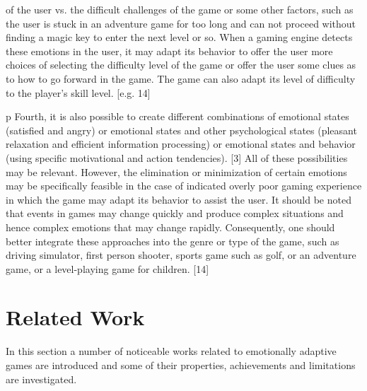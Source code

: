 of the user vs. the difficult challenges of the game or some other factors, such as the user is stuck in an adventure game for too long and can not proceed without finding a magic key to enter the next level or so. When a gaming engine detects these emotions in the user, it may adapt its behavior to offer the user more choices of selecting the difficulty level of the game or offer the user some clues as to how to go forward in the game. The game can also adapt its level of difficulty to the player’s skill level. [e.g. 14]

p Fourth, it is also possible to create different combinations of emotional states (satisfied and angry) or emotional states and other psychological states (pleasant relaxation and efficient information processing) or emotional states and behavior (using specific motivational and action tendencies). [3]  All of these possibilities may be relevant. However, the elimination or minimization of certain emotions may be specifically feasible in the case of indicated overly poor gaming experience in which the game may adapt its behavior to assist the user. It should be noted that events in games may change quickly and produce complex situations and hence complex emotions that may change rapidly. Consequently, one should better integrate these approaches into the genre or type of the game, such as driving simulator, first person shooter, sports game such as golf, or an adventure game, or a level-playing game for children. [14]

\section{Related Work}

In this section a number of noticeable works related to emotionally adaptive games are introduced and some of their properties, achievements and limitations are investigated.

